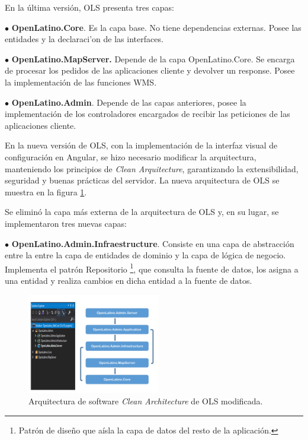 En la \'ultima versi\'on, OLS presenta tres capas:

$\bullet$ \textbf{OpenLatino.Core}. Es la capa base. No tiene dependencias externas. Posee las entidades y la declaraci'on de las interfaces.

$\bullet$ \textbf{OpenLatino.MapServer.} Depende de la capa OpenLatino.Core. Se encarga de procesar los pedidos de las aplicaciones cliente y devolver un response. Posee la implementaci\'on de las funciones WMS.

$\bullet$ \textbf{OpenLatino.Admin}. Depende de las capas anteriores, posee la implementaci\'on de los controladores encargados de recibir las peticiones de las aplicaciones cliente.

En la nueva versi\'on de OLS, con la implementaci\'on de la interfaz visual de configuraci\'on en Angular, se hizo necesario modificar la arquitectura, manteniendo los principios de \textit{Clean Arquitecture}, garantizando la extensibilidad, seguridad y buenas pr\'acticas del servidor. La nueva arquitectura de OLS se muestra en la figura \ref{cleanArquitectureNew}.

Se elimin\'o la capa m\'as externa de la arquitectura de OLS y, en su lugar, se implementaron tres nuevas capas:

$\bullet$ \textbf{OpenLatino.Admin.Infraestructure}. Consiste en una capa de abstracci\'on entre la entre la capa de entidades de dominio y la capa de l\'ogica de negocio. Implementa el patr\'on Repositorio \footnote{Patr\'on de dise\~no que a\'isla la capa de datos del resto de la aplicaci\'on.}, que consulta la fuente de datos, los asigna a una entidad y realiza cambios en dicha entidad a la fuente de datos.

\begin{figure}
\vspace{-20pt}
\begin{center}
\includegraphics[width=0.52\textwidth]{images/cleanArquitectureNew.png} 
\end{center} \vspace{-20pt} \caption{Arquitectura de software \textit{Clean Architecture} de OLS modificada.}  \label{cleanArquitectureNew} \vspace{-10pt} 
\end{figure}

